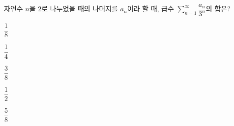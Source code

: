자연수 $n$을 $2$로 나누었을 때의 나머지를 $a_n$이라 할 때, 급수 $\displaystyle\sum_{n=1}^{\infty} \dfrac{a_n}{3^n}$의 합은?
\begin{choices32}{\rule[-3ex]{0pt}{8ex}$\dfrac{1}{8}$}{\rule[-3ex]{0pt}{8ex}$\dfrac{1}{4}$}{\rule[-3ex]{0pt}{8ex}$\dfrac{3}{8}$}{\rule[-3ex]{0pt}{8ex}$\dfrac{1}{2}$}{\rule[-3ex]{0pt}{8ex}$\dfrac{5}{8}$}\end{choices32}
